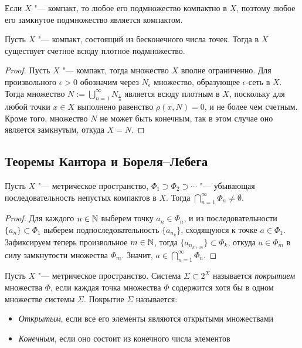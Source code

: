 \begin{note}
    Если $X$ "--- компакт, то любое его подмножество компактно в $X$, поэтому любое его замкнутое подмножество является компактом.
\end{note}

\begin{theorem}
    Пусть $X$ "--- компакт, состоящий из бесконечного числа точек. Тогда в $X$ существует счетное всюду плотное подмножество.
\end{theorem}

\begin{proof}
    Пусть $X$ "--- компакт, тогда множество $X$ вполне ограниченно. Для произвольного $\epsilon > 0$ обозначим через $N_\epsilon$ множество, образующее $\epsilon$-сеть в $X$. Тогда множество $N := \bigcup_{n=1}^{\infty}N_{\frac1{n}}$ является всюду плотным в $X$, поскольку для любой точки $x\in X$ выполнено равенство $\rho(x, N)=0$, и не более чем счетным. Кроме того, множество $N$ не может быть конечным, так в этом случае оно является замкнутым, откуда $X = N$.
\end{proof}

\subsection{Теоремы Кантора и Бореля--Лебега}

\begin{theorem}[Кантора]
    Пусть $X$ "--- метрическое пространство, $\Phi_1\supset \Phi_2\supset\dotsb$ "--- убывающая последовательность непустых компактов в $X$. Тогда $\bigcap_{n=1}^{\infty}\Phi_n \ne \emptyset$.
\end{theorem}

\begin{proof}
    Для каждого $n \in \mathbb{N}$ выберем точку $a_n \in \Phi_n$, и из последовательности $\lbrace a_n\rbrace \subset \Phi_1$ выберем подпоследовательность $\lbrace a_{n_k}\rbrace$, сходящуюся к точке $a \in \Phi_1$. Зафиксируем теперь произвольное $m \in \mathbb{N}$, тогда $\{a_{n_{k + m}}\} \subset \Phi_k$, откуда $a \in \Phi_m$ в силу замкнутости множества $\Phi_m$. Значит, $a \in \bigcap_{n=1}^{\infty}\Phi_n$.
\end{proof}

\begin{definition}
    Пусть $X$ "--- метрическое пространство. Система $\Sigma \subset 2^X$ называется \textit{покрытием} множества $\Phi$, если каждая точка множества $\Phi$ содержится хотя бы в одном множестве системы $\Sigma$. Покрытие $\Sigma$ называется:
    \begin{itemize}
        \item \textit{Открытым}, если все его элементы являются открытыми множествами
        \item \textit{Конечным}, если оно состоит из конечного числа элементов
    \end{itemize}
\end{definition}

